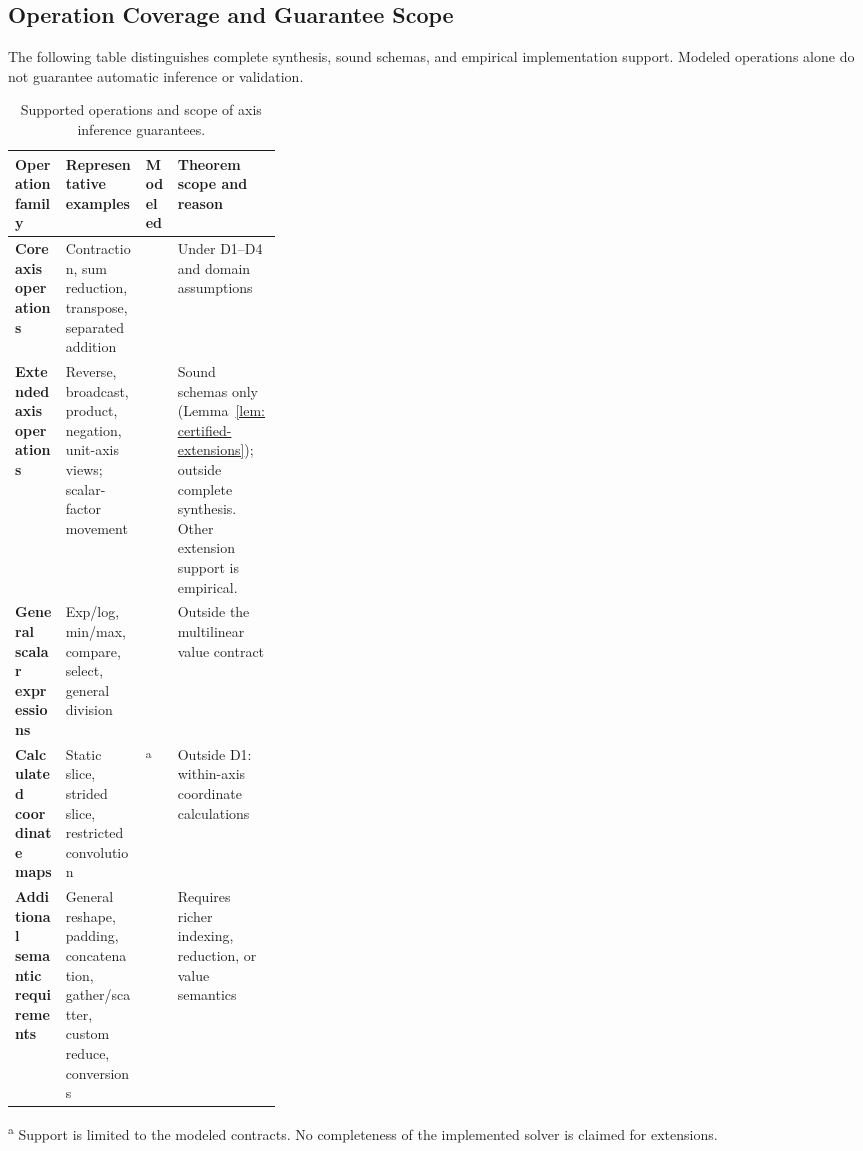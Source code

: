 \subsection{Operation Coverage and Guarantee Scope}
\label{app:operation-coverage}
The following table distinguishes complete synthesis, sound schemas,
and empirical implementation support. Modeled operations alone do
not guarantee automatic inference or validation.

\begin{table}[!htbp]
\caption{Supported operations and scope of axis inference guarantees.}
\label{tab:semantic-coverage}
\centering
\small
\setlength{\tabcolsep}{4pt}
\renewcommand{\arraystretch}{1}
\begin{tabularx}{\linewidth}{@{}>{\raggedright\arraybackslash}p{0.19\linewidth}Y>{\centering\arraybackslash}p{0.12\linewidth}Y@{}}\toprule
Operation family & Representative examples & Modeled & Theorem scope and reason\\[2pt]\midrule
\textbf{Core axis operations}
& Contraction, sum reduction, transpose, separated addition
& \textcolor{green!45!black}{}
& \textcolor{green!45!black}{} Under D1--D4 and domain assumptions\\
\addlinespace
\textbf{Extended axis operations}
& Reverse, broadcast, product, negation, unit-axis views; scalar-factor movement
& \textcolor{green!45!black}{}
& Sound schemas only (Lemma~\ref{lem:certified-extensions}); outside complete
synthesis. Other extension support is empirical.\\
\addlinespace
\textbf{General scalar expressions}
& Exp/log, min/max, compare, select, general division
& \textcolor{green!45!black}{}
& \textcolor{red!75!black}{} Outside the multilinear value contract\\
\addlinespace
\textbf{Calculated coordinate maps}
& Static slice, strided slice, restricted convolution
& \textcolor{green!45!black}{}\textsuperscript{a}
& \textcolor{red!75!black}{} Outside D1: within-axis coordinate calculations\\
\addlinespace
\textbf{Additional semantic requirements}
& General reshape, padding, concatenation, gather/scatter, custom reduce, conversions
& \textcolor{red!75!black}{}
& \textcolor{red!75!black}{} Requires richer indexing, reduction, or value semantics\\\bottomrule
\end{tabularx}
\par\smallskip
\begin{minipage}{\linewidth}
\footnotesize
\textsuperscript{a} Support is limited to the modeled contracts.
No completeness of the implemented solver is claimed for extensions.
\end{minipage}
\end{table}
